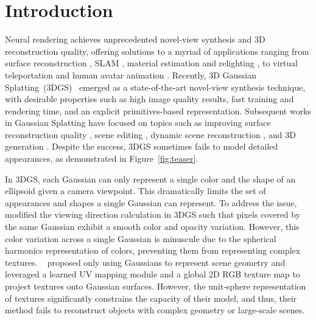\section{Introduction}
\label{sec:intro}
Neural rendering \cite{tewari2022advances} achieves unprecedented novel-view synthesis and 3D reconstruction quality, offering solutions to a myriad of applications ranging from surface reconstruction \cite{li2023neuralangelo, wang2021neus}, SLAM \cite{rosinol2023nerfslam, nice2022CVPR}, material estimation and relighting \cite{nerfactor2021, nerv2021}, to virtual teleportation and human avatar animation \cite{weng2022humannerf, su2021anerf}. Recently, 3D Gaussian Splatting~(3DGS)~\cite{kerbl3Dgaussians} emerged as a state-of-the-art novel-view synthesis technique, with desirable properties such as high image quality results, fast training and rendering time, and an explicit primitives-based representation. 
Subsequent works in Gaussian Splatting have focused on topics such as improving surface reconstruction quality \cite{Huang2DGS2024, guedon2023sugar}, scene editing \cite{guedon2024frosting, chen2024gaussianeditor}, dynamic scene reconstruction \cite{ yang2023deformable3dgs,shih2024modeling}, and 3D generation \cite{tang2023dreamgaussian, ren2023dreamgaussian4d}.
Despite the success, 3DGS sometimes fails to model detailed appearances, as demonstrated in Figure~\ref{fig:teaser}.


In 3DGS, each Gaussian can only represent a single color and the shape of an ellipsoid given a camera viewpoint. 
This dramatically limits the set of appearances and shapes a single Gaussian can represent. 
To address the issue, \citet{huang2024spatial} modified the viewing direction calculation in 3DGS such that pixels covered by the same Gaussian exhibit a smooth color and opacity variation. 
However, this color variation across a single Gaussian is minuscule due to the spherical harmonics representation of colors, preventing them from representing complex textures. ~\citet{xu2024texturegs} proposed only using Gaussians to represent scene geometry and leveraged a learned UV mapping module and a global 2D RGB texture map to project textures onto Gaussian surfaces. 
However, the unit-sphere representation of textures significantly constrains the capacity of their model, and thus, their method fails to reconstruct objects with complex geometry or large-scale scenes.

